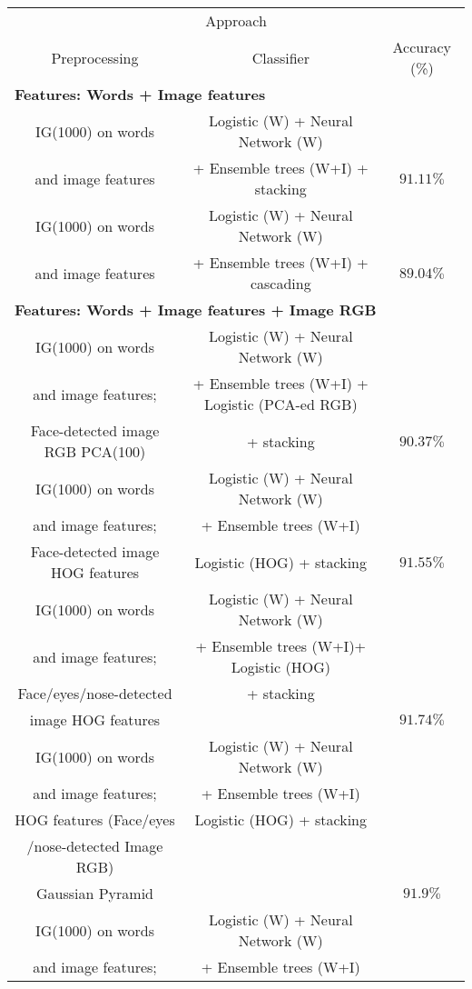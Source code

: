 \begin{table}[h!]
\centering
\begin{tabular}{ c c c}
\hline
\multicolumn{3}{c}{Approach} \\
\cline{1-2}
Preprocessing & Classifier & Accuracy (\%) \\
\hline
\hline
\multicolumn{3}{l}{\textbf{Features: Words + Image features}} \\
IG(1000) on words & Logistic (W) + Neural Network (W) & \\
and image features  & + Ensemble trees (W+I) + stacking & $91.11\%$ \\ \hline
IG(1000) on words & Logistic (W) + Neural Network (W) &  \\
and image features  & + Ensemble trees (W+I) + cascading & $89.04\%$ \\ \hline
\multicolumn{3}{l}{\textbf{Features: Words + Image features + Image RGB}} \\
\hline
IG(1000) on words & Logistic (W) + Neural Network (W) & \\ 
and image features; & + Ensemble trees (W+I) + Logistic (PCA-ed RGB) & \\
Face-detected image RGB PCA(100) & + stacking & $ 90.37\%$ \\ \hline 
IG(1000) on words & Logistic (W) + Neural Network (W) & \\ 
and image features; & + Ensemble trees (W+I) & \\
Face-detected image HOG features & Logistic (HOG) + stacking & $ 91.55\%$ \\ \hline
IG(1000) on words & Logistic (W) + Neural Network (W) & \\ 
and image features; & + Ensemble trees (W+I)+ Logistic (HOG) & \\
Face/eyes/nose-detected & + stacking & \\
image HOG features & & $ 91.74\%$ \\
\hline
IG(1000) on words & Logistic (W) + Neural Network (W) & \\ 
and image features; & + Ensemble trees (W+I) & \\
HOG features (Face/eyes & Logistic (HOG) + stacking &\\
/nose-detected Image RGB) & &  \\ 
Gaussian Pyramid & & $91.9\%$  \\ \hline
IG(1000) on words & Logistic (W) + Neural Network (W) & \\ 
and image features; & + Ensemble trees (W+I) & \\

\end{tabular}
\end{table}
